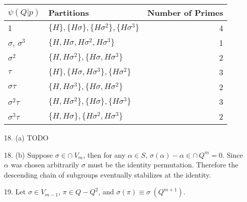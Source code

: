 \documentclass{article}
\newcommand{\w}[0]{\omega}
\newcommand{\Q}[0]{\mathbb{Q}}
\newcommand{\Z}[0]{\mathbb{Z}}
\newcommand{\modequiv}[3]{#1 \equiv #2\ (#3)}
\newcommand{\gal}[2]{\text{Gal}(#1 / #2)}
\begin{document}
\begin{enumerate}
\begin{tabular}{|l|l|r|}
    \hline
    $\psi(Q|p)$ & Partitions & Number of Primes \\
    \hline
    1 & $\{H\}, \{H\sigma\}, \{H\sigma^2\}, \{H\sigma^3\}$ & 4 \\
    $\sigma$, $\sigma^3$ & $\{H, H\sigma, H\sigma^2, H\sigma^3\}$ & 1\\
    $\sigma^2$ & $\{H, H\sigma^2\}, \{H\sigma, H\sigma^3\}$ & 2\\
    $\tau$ & $\{H\}, \{H\sigma, H\sigma^3\}, \{H\sigma^2\}$ & 3 \\
    $\sigma\tau$ & $\{H, H\sigma^3\}, \{H\sigma, H\sigma^2\}$ & 2 \\
    $\sigma^2\tau$ & $\{H, H\sigma^2\}, \{H\sigma\}, \{H\sigma^3\}$ & 3 \\
    $\sigma^3\tau$ & $\{H, H\sigma\}, \{H\sigma^2, H\sigma^3\}$ & 2 \\
    \hline
\end{tabular}







\item[18. (a)] TODO
\item[18. (b)]  Suppose $\sigma \in \cap\ V_{m}$, then for any $\alpha \in S$, $\sigma(\alpha) - \alpha \in \cap\ Q^{m} = 0$.  Since $\alpha$ was chosen arbitrarily $\sigma$ must be the identity permutation.  Therefore the descending chain of subgroups eventually stabilizes at the identity.

\item[19.] Let $\sigma \in V_{m-1}$, $\pi \in Q - Q^2$, and $\modequiv{\sigma(\pi)}{\sigma}{Q^{m+1}}$.


\end{enumerate}
\end{document}

